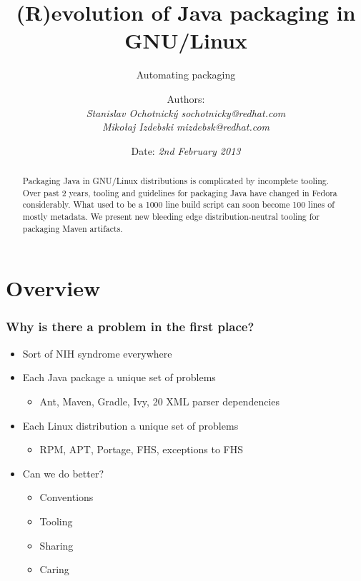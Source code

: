 \documentclass[pdftex,unicode,xcolor=table]{beamer}
\title{(R)evolution of Java packaging in GNU/Linux}
\subtitle{Automating packaging}
\author{Authors: \\
  \em{Stanislav Ochotnický} sochotnicky@redhat.com\\
  \em{Mikołaj Izdebski} mizdebsk@redhat.com}
\date{Date: \em{2nd February 2013}}
\begin{document}
 {
  \maketitle
  \newpage
}

\begin{rhbg}
  \begin{frame}
    \titlepage
    \begin{abstract}
      Packaging Java in GNU/Linux distributions is complicated by incomplete
      tooling. Over past 2 years, tooling and guidelines for packaging Java have
      changed in Fedora considerably. What used to be a 1000 line build
      script can soon become 100 lines of mostly metadata.  We present new
      bleeding edge distribution-neutral tooling for packaging Maven artifacts.
    \end{abstract}
  \end{frame}
\end{rhbg}


\section{Overview}
\Large
\begin{frame}
  \frametitle{Why is there a problem in the first place?}
  \begin{itemize}
  \item Sort of NIH syndrome everywhere
  \item Each Java package a unique set of problems
    \begin{itemize}
      \item Ant, Maven, Gradle, Ivy, 20 XML parser dependencies
    \end{itemize}
  \item Each Linux distribution a unique set of problems
    \begin{itemize}
      \item RPM, APT, Portage, FHS, exceptions to FHS
    \end{itemize}
  \item Can we do better?
    \begin{itemize}
      \item Conventions
      \item Tooling
      \item Sharing
      \item Caring
    \end{itemize}
  \end{itemize}
\end{frame}
\end{document}
